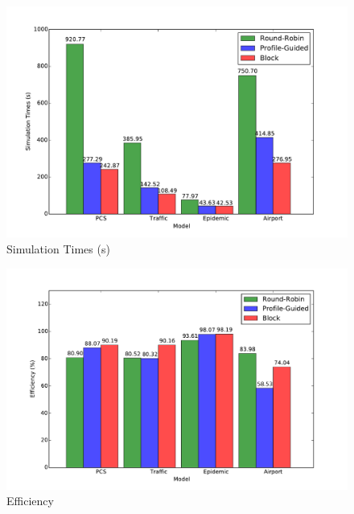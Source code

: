 \documentclass[11pt]{book}
\begin{document}
\begin{figure}
  \begin{minipage}{.5\textwidth}
    \begin{center}
      \includegraphics[width=\textwidth,keepaspectratio,quiet]{figs/partitioning_communication/partitioning_time_8node.pdf} \\
      Simulation Times (s) \\
    \end{center}
  \end{minipage}%
  \hfill
  \begin{minipage}{.5\textwidth}
    \begin{center}
      \includegraphics[width=\textwidth,keepaspectratio,quiet]{figs/partitioning_communication/partitioning_efficiency_8node.pdf} \\
      Efficiency \\
    \end{center}

\end{minipage}
\end{figure}
\end{document}

